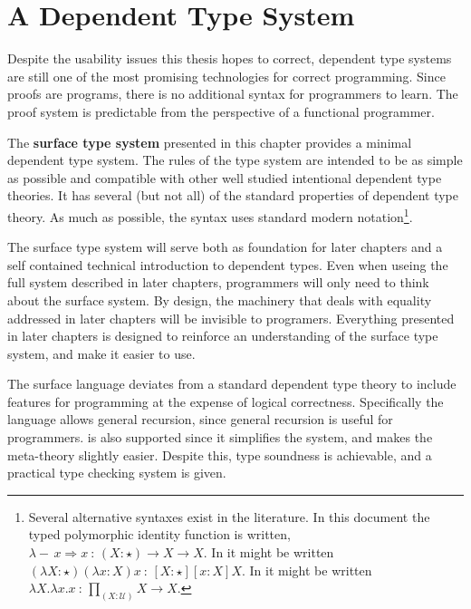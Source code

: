 \chapter{A Dependent Type System}
\label{chapter:Surface}
\thispagestyle{myheadings}


Despite the usability issues this thesis hopes to correct, dependent type systems are still one of the most promising technologies for correct programming.
Since proofs are programs, there is no additional syntax for programmers to learn.
The proof system is predictable from the perspective of a functional programmer. 

The \textbf{surface type system} presented in this chapter provides a minimal dependent type system.
The rules of the type system are intended to be as simple as possible and compatible with other well studied intentional dependent type theories.
It has several (but not all) of the standard properties of dependent type theory.
As much as possible, the syntax uses standard modern notation\footnote{
  Several alternative syntaxes exist in the literature.
  In this document the typed polymorphic identity function is written, $\lambda-\,x\Rightarrow x\ :\,\left(X:\star\right)\rightarrow X\rightarrow X$.
  In \cite{10.1016/0890-5401(88)90005-3} it might be written $\left(\lambda X:\star\right)\left(\lambda x:X\right)x\ :\,\left[X:\star\right]\left[x:X\right]X$.
  In \cite{HoTTbook} it might be written $\lambda X.\lambda x.x\ :\,\underset{\left(X:\mathcal{U}\right)}{\prod}X\rightarrow X$.}.

The surface type system will serve both as foundation for later chapters and a self contained technical introduction to dependent types.
Even when useing the full system described in later chapters, programmers will only need to think about the surface system.
By design, the machinery that deals with equality addressed in later chapters will be invisible to programers.
Everything presented in later chapters is designed to reinforce an understanding of the surface type system, and make it easier to use.

The surface language deviates from a standard dependent type theory to include features for programming at the expense of logical correctness.
Specifically the language allows general recursion, since general recursion is useful for programmers.
\Tit{} is also supported since it simplifies the system, and makes the meta-theory slightly easier.
Despite this, type soundness is achievable, and a practical type checking system is given.

